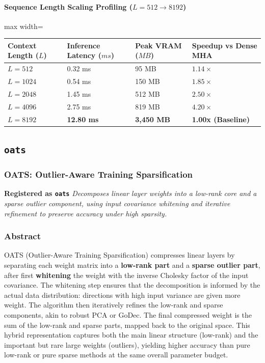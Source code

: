 \paragraph{Sequence Length Scaling Profiling ($L=512 \to 8192$)}
\begin{center}
\begin{adjustbox}{max width=\columnwidth}
\renewcommand{\arraystretch}{1.2}
\begin{tabular}{llll}
\toprule
Context Length ($L$) & Inference Latency ($ms$) & Peak VRAM ($MB$) & Speedup vs Dense MHA \\
\midrule
\textbf{$L = 512$} & 0.32 ms & 95 MB & $1.14\times$ \\
\textbf{$L = 1024$} & 0.54 ms & 150 MB & $1.85\times$ \\
\textbf{$L = 2048$} & 1.45 ms & 512 MB & $2.50\times$ \\
\textbf{$L = 4096$} & 2.75 ms & 819 MB & $4.20\times$ \\
\textbf{$L = 8192$} & \textbf{12.80 ms} & \textbf{3,450 MB} & \textbf{1.00x (Baseline)} \\


\bottomrule
\end{tabular}
\end{adjustbox}
\end{center}

\subsection{\texttt{oats}}
\subsubsection*{OATS: Outlier-Aware Training Sparsification}

\textbf{Registered as \texttt{oats}}
\textit{Decomposes linear layer weights into a low-rank core and a sparse outlier component, using input covariance whitening and iterative refinement to preserve accuracy under high sparsity.}


\subsubsection*{Abstract}

OATS (Outlier-Aware Training Sparsification) compresses linear layers by separating each weight matrix into a \textbf{low-rank part} and a \textbf{sparse outlier part}, after first \textbf{whitening} the weight with the inverse Cholesky factor of the input covariance. The whitening step ensures that the decomposition is informed by the actual data distribution: directions with high input variance are given more weight. The algorithm then iteratively refines the low-rank and sparse components, akin to robust PCA or GoDec. The final compressed weight is the sum of the low-rank and sparse parts, mapped back to the original space. This hybrid representation captures both the main linear structure (low-rank) and the important but rare large weights (outliers), yielding higher accuracy than pure low-rank or pure sparse methods at the same overall parameter budget.


